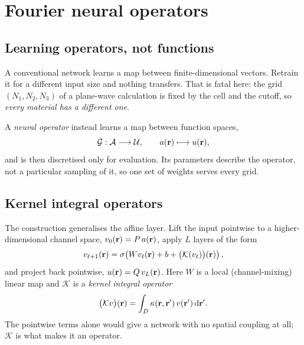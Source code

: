 \chapter{Fourier neural operators}
\label{ch:fno}

\section{Learning operators, not functions}

A conventional network learns a map between finite-dimensional vectors. Retrain
it for a different input size and nothing transfers. That is fatal here: the
grid $(N_1,N_2,N_3)$ of a plane-wave calculation is fixed by the cell and the
cutoff, so \emph{every material has a different one}.

A \emph{neural operator} instead learns a map between function spaces,
\begin{equation}
  \mathcal{G}: \mathcal{A} \longrightarrow \mathcal{U},
  \qquad
  a(\mathbf{r}) \longmapsto u(\mathbf{r}),
\end{equation}
and is then discretised only for evaluation. Its parameters describe the
operator, not a particular sampling of it, so one set of weights serves every
grid.

\section{Kernel integral operators}

The construction generalises the affine layer. Lift the input pointwise to a
higher-dimensional channel space, $v_0(\mathbf{r}) = P\,a(\mathbf{r})$, apply $L$ layers of
the form
\begin{equation}
  v_{\ell+1}(\mathbf{r}) = \sigma\!\left(
      W v_{\ell}(\mathbf{r}) + b
      + \bigl(\mathcal{K}(v_\ell)\bigr)(\mathbf{r}) \right),
  \label{eq:noperator}
\end{equation}
and project back pointwise, $u(\mathbf{r}) = Q\,v_L(\mathbf{r})$. Here $W$ is a local
(channel-mixing) linear map and $\mathcal{K}$ is a \emph{kernel integral
operator}
\begin{equation}
  \bigl(\mathcal{K}v\bigr)(\mathbf{r}) = \int_D \kappa(\mathbf{r},\mathbf{r}')\,v(\mathbf{r}')\,\mathrm{d}\mathbf{r}' .
\end{equation}
The pointwise terms alone would give a network with no spatial coupling at all;
$\mathcal{K}$ is what makes it an operator.

